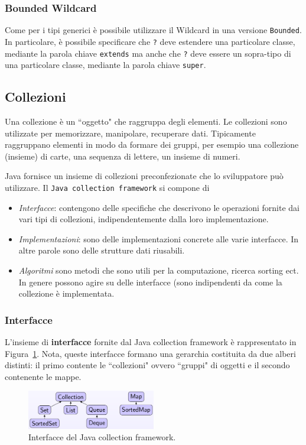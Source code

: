 \documentclass{article}
\begin{document}
\subsubsection{Bounded Wildcard}
Come per i tipi generici \`e possibile utilizzare il Wildcard in una versione \texttt{Bounded}. In particolare, \`e possibile specificare che \texttt{?} deve estendere una particolare classe, mediante la parola chiave \texttt{extends} ma anche che \texttt{?} deve essere un sopra-tipo di una particolare classe, mediante la parola chiave \texttt{super}.

\subsection{Collezioni}
Una collezione \`e un ``oggetto" che raggruppa degli elementi. Le collezioni sono utilizzate per memorizzare, manipolare, recuperare dati. Tipicamente raggruppano elementi in modo da formare dei gruppi, per esempio una collezione (insieme) di carte, una sequenza di lettere, un insieme di numeri. 

Java fornisce un insieme di collezioni preconfezionate che lo sviluppatore pu\`o utilizzare. Il \texttt{Java collection framework} si compone di 
\begin{itemize}
\item \emph{Interfacce}: contengono delle specifiche che descrivono le operazioni fornite dai vari tipi di collezioni, indipendentemente dalla loro implementazione. 
\item \emph{Implementazioni}: sono delle implementazioni concrete alle varie interfacce. In altre parole sono delle strutture dati riusabili.
\item \emph{Algoritmi} sono metodi che sono utili per la computazione, ricerca sorting ect. In genere possono agire su delle interfacce (sono indipendenti da come la collezione \`e implementata. 
\end{itemize}

\subsubsection{Interfacce}
L'insieme di \textbf{interfacce} fornite dal Java collection framework \`e rappresentato in Figura~\ref{Fig:collections}. Nota, queste interfacce formano una gerarchia costituita da due alberi distinti: il primo contente le ``collezioni" ovvero ``gruppi" di oggetti e il secondo contenente le mappe.

\begin{figure}[h!]
  \centering
    \includegraphics[width=0.5\textwidth]{colls-coreInterfaces.png}
  \caption{Interfacce del  Java collection framework.}
    \label{Fig:collections}
\end{figure}
\end{document}
